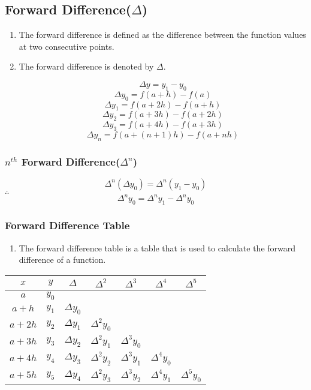 

\subsection{Forward Difference($\Delta$)}

\begin{enumerate}
  \item The forward difference is defined as the difference between the function values at two consecutive points.
  \item The forward difference is denoted by $\Delta$.


        \[\Delta y = y_1 - y_0\]
        \[\Delta y_0 = f(a+h) - f(a)\]
        \[\Delta y_1 = f(a+2h) - f(a+h)\]
        \[\Delta y_2 = f(a+3h) - f(a+2h)\]
        \[\Delta y_3 = f(a+4h) - f(a+3h)\]
        \[\Delta y_n = f(a+(n+1)h) - f(a+nh)\]
\end{enumerate}

\subsubsection{$n^{th}$ Forward Difference($\Delta^n$)}

\[\Delta^n(\Delta y_0) = \Delta^n(y_1 - y_0)\]
$\therefore$ \[\Delta^n y_0 = \Delta^n y_1 - \Delta^n y_0\]


\subsubsection{Forward Difference Table}

\begin{enumerate}
  \item The forward difference table is a table that is used to calculate the forward difference of a function.
\end{enumerate}


\begin{center}
\begin{tabular}{|c|c|c|c|c|c|c|}
    \hline
    $x$ & $y$ & $\Delta$ & $\Delta^2$ & $\Delta^3$ & $\Delta^4$ & $\Delta^5$\\
    \hline
    $a$ & $y_0$ & & & & &\\
    \hline
    $a + h$ & $y_1$ & $\Delta y_0$ & & & &\\
    \hline
    $a + 2h$ & $y_2$ & $\Delta y_1$ & $\Delta^2 y_0$ & & &\\
    \hline
    $a + 3h$ & $y_3$ & $\Delta y_2$ & $\Delta^2 y_1$ & $\Delta^3 y_0$ & &\\
    \hline
    $a + 4h$ & $y_4$ & $\Delta y_3$ & $\Delta^2 y_2$ & $\Delta^3 y_1$ & $\Delta^4 y_0$ &\\
    \hline
    $a + 5h$ & $y_5$ & $\Delta y_4$ & $\Delta^2 y_3$ & $\Delta^3 y_2$ & $\Delta^4 y_1$ & $\Delta^5 y_0$\\
    \hline
\end{tabular}
\end{center}
